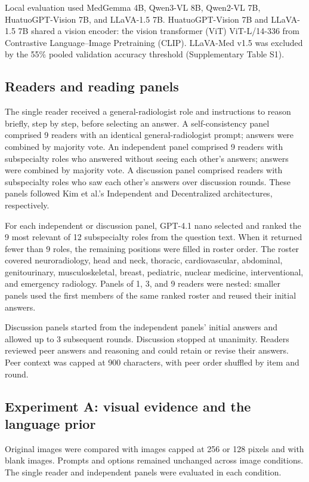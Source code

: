 Local evaluation used MedGemma 4B, Qwen3-VL 8B, Qwen2-VL 7B, HuatuoGPT-Vision 7B, and LLaVA-1.5 7B.\cite{sellergren2025medgemma,bai2025qwen3vl,wang2024qwen2vl,chen2024huatuovision,liu2024llava15}
HuatuoGPT-Vision 7B and LLaVA-1.5 7B shared a vision encoder: the vision transformer (ViT) ViT-L/14-336 from Contrastive Language--Image Pretraining (CLIP).\cite{radford2021clip}
LLaVA-Med v1.5 was excluded by the 55\% pooled validation accuracy threshold (Supplementary Table S1).

\subsection{Readers and reading panels}
The single reader received a general-radiologist role and instructions to reason briefly, step by step, before selecting an answer.
A self-consistency panel comprised 9 readers with an identical general-radiologist prompt; answers were combined by majority vote.\cite{wang2023selfconsistency}
An independent panel comprised 9 readers with subspecialty roles who answered without seeing each other's answers; answers were combined by majority vote.
A discussion panel comprised readers with subspecialty roles who saw each other's answers over discussion rounds.
These panels followed Kim et al.'s Independent and Decentralized architectures, respectively.\cite{kim2026scaling}

For each independent or discussion panel, GPT-4.1 nano selected and ranked the 9 most relevant of 12 subspecialty roles from the question text.
When it returned fewer than 9 roles, the remaining positions were filled in roster order.
The roster covered neuroradiology, head and neck, thoracic, cardiovascular, abdominal, genitourinary, musculoskeletal, breast, pediatric, nuclear medicine, interventional, and emergency radiology.
Panels of 1, 3, and 9 readers were nested: smaller panels used the first members of the same ranked roster and reused their initial answers.

Discussion panels started from the independent panels' initial answers and allowed up to 3 subsequent rounds.
Discussion stopped at unanimity.
Readers reviewed peer answers and reasoning and could retain or revise their answers.
Peer context was capped at 900 characters, with peer order shuffled by item and round.

\subsection{Experiment A: visual evidence and the language prior}
Original images were compared with images capped at 256 or 128 pixels and with blank images.
Prompts and options remained unchanged across image conditions.
The single reader and independent panels were evaluated in each condition.


